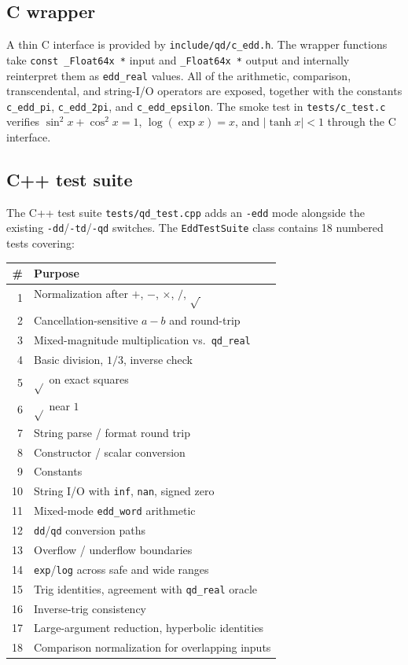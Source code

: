 \documentclass[11pt,a4paper]{article}
\begin{document}
\subsection{C wrapper}

A thin C interface is provided by \texttt{include/qd/c\_edd.h}.
The wrapper functions take \texttt{const \_Float64x *} input and
\texttt{\_Float64x *} output and internally reinterpret them as
\texttt{edd\_real} values.  All of the arithmetic, comparison,
transcendental, and string-I/O operators are exposed, together
with the constants \texttt{c\_edd\_pi}, \texttt{c\_edd\_2pi}, and
\texttt{c\_edd\_epsilon}.  The smoke test in \texttt{tests/c\_test.c}
verifies $\sin^2 x + \cos^2 x = 1$, $\log(\exp x) = x$, and
$|\tanh x| < 1$ through the C interface.

\subsection{C++ test suite}

The C++ test suite \texttt{tests/qd\_test.cpp} adds an
\texttt{-edd} mode alongside the existing
\texttt{-dd}/\texttt{-td}/\texttt{-qd} switches.  The
\texttt{EddTestSuite} class contains 18 numbered tests covering:

\begin{center}
\begin{tabular}{rl}
\toprule
\# & Purpose \\
\midrule
1  & Normalization after $+$, $-$, $\times$, $/$, $\sqrt{\,}$ \\
2  & Cancellation-sensitive $a-b$ and round-trip \\
3  & Mixed-magnitude multiplication vs.\ \texttt{qd\_real} \\
4  & Basic division, $1/3$, inverse check \\
5  & $\sqrt{}$ on exact squares \\
6  & $\sqrt{}$ near $1$ \\
7  & String parse / format round trip \\
8  & Constructor / scalar conversion \\
9  & Constants \\
10 & String I/O with \texttt{inf}, \texttt{nan}, signed zero \\
11 & Mixed-mode \texttt{edd\_word} arithmetic \\
12 & \texttt{dd}/\texttt{qd} conversion paths \\
13 & Overflow / underflow boundaries \\
14 & \texttt{exp}/\texttt{log} across safe and wide ranges \\
15 & Trig identities, agreement with \texttt{qd\_real} oracle \\
16 & Inverse-trig consistency \\
17 & Large-argument reduction, hyperbolic identities \\
18 & Comparison normalization for overlapping inputs \\
\bottomrule
\end{tabular}
\end{center}
\end{document}
